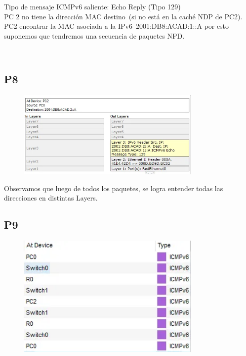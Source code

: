 \documentclass{article}
\begin{document}
Tipo de mensaje ICMPv6 saliente: Echo Reply (Tipo 129)\\

PC 2 no tiene la dirección MAC destino (si no está en la caché NDP de PC2). PC2 encontrar la MAC asociada a la IPv6 2001:DB8:ACAD:1::A por esto suponemos que tendremos una secuencia de paquetes NPD.

\
\subsection*{P8}
\begin{figure}[H] 
    \centering
    \includegraphics[width=0.8\textwidth]{imagen10.PNG}
    \caption{}
    \label{fig:ejemplo}
\end{figure}


Observamos que luego de todos los paquetes, se logra entender todas las direcciones en distintas Layers.

\subsection*{P9}
\begin{figure}[H] 
    \centering
    \includegraphics[width=0.8\textwidth]{imagen11.PNG}
    \caption{}
    \label{fig:ejemplo}
\end{figure}
\end{document}
